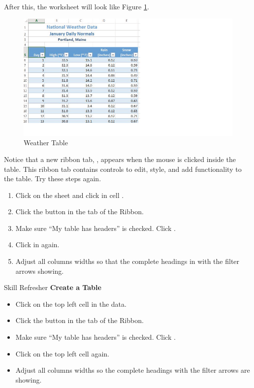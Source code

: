 After this, the worksheet will look like Figure \ref{05:fig03}.

\begin{figure}[H]
	\centering
	\includegraphics[width=\maxwidth{.95\linewidth}]{gfx/ch05_fig03}
	\caption{Weather Table}
	\label{05:fig03}
\end{figure}

Notice that a new ribbon tab, , appears when the mouse is clicked inside the table. This ribbon tab contains controls to edit, style, and add functionality to the table. Try these steps again.

\begin{enumerate}
	\item Click on the  sheet and click in cell .
	\item Click the  button in the  tab of the Ribbon.
	\item Make sure ``My table has headers'' is checked. Click .
	\item Click in  again.
	\item Adjust all columns widths so that the complete headings in  with the filter arrows showing.
\end{enumerate}

\begin{center}
	\begin{sklbox}{Skill Refresher}
		\textbf{Create a Table}
		\\
		\begin{itemize}
			\setlength{\itemsep}{0pt}
			\setlength{\parskip}{0pt}
			\setlength{\parsep}{0pt}

			\item Click on the top left cell in the data.
			\item Click the  button in the  tab of the Ribbon.
			\item Make sure ``My table has headers'' is checked. Click .
			\item Click on the top left cell again.
			\item Adjust all columns widths so the complete headings with the filter arrows are showing.
						
		\end{itemize}
	\end{sklbox}
\end{center}

